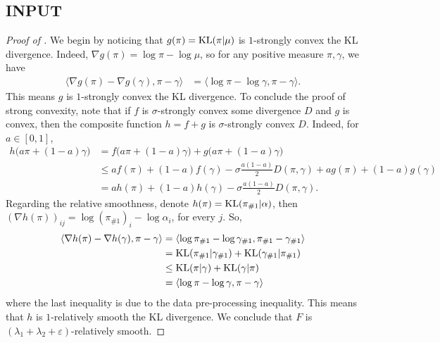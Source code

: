 \subsection{INPUT}
\begin{proof}[Proof of ]
We begin by noticing that $g(\pi) = \text{KL}(\pi | \mu)$ is $1$-strongly convex \wrt the KL divergence.
Indeed, $\nabla g(\pi) = \log \pi - \log \mu$, so for any positive measure $\pi, \gamma$, we have
\begin{align}
    \langle \nabla g(\pi) - \nabla g(\gamma), \pi - \gamma \rangle
    &= \langle
    \log \pi - \log \gamma, \pi - \gamma \rangle.
\end{align}
This means $g$ is $1$-strongly convex \wrt the KL divergence.
To conclude the proof of strong convexity, note that if $f$ is $\sigma$-strongly convex \wrt
some divergence $D$ and $g$ is convex, then the composite function $h = f + g$ is
$\sigma$-strongly convex \wrt $D$. Indeed, for $a \in [0,1]$,
\begin{align}
    h \big( a \pi + (1-a) \gamma \big)
    &= f \big( a \pi + (1-a) \gamma \big) + g \big( a \pi + (1-a) \gamma \big) \\
    &\leq a f(\pi) + (1 - a) f(\gamma) - \sigma \frac{a (1 - a)}{2} D(\pi, \gamma)
    + a g(\pi) + (1 - a) g(\gamma) \\
    &= a h(\pi) + (1 - a) h(\gamma) - \sigma \frac{a (1 - a)}{2} D(\pi, \gamma).
\end{align}
Regarding the relative smoothness, denote $h(\pi) = \text{KL}(\pi_{\#1} | \alpha)$,
then $(\nabla h(\pi))_{ij} = \log (\pi_{\#1})_i - \log \alpha_i$, for every $j$. So,
\begin{equation}
    \begin{split}
        \langle \nabla h(\pi) - \nabla h(\gamma), \pi - \gamma \rangle
    &= \langle
    \log \pi_{\# 1} - \log \gamma_{\# 1}, \pi_{\# 1} - \gamma_{\# 1} \rangle\\
    &= \text{KL}(\pi_{\# 1} | \gamma_{\# 1}) + \text{KL}(\gamma_{\# 1} | \pi_{\# 1}) \\
    &\leq \text{KL}(\pi | \gamma) + \text{KL}(\gamma | \pi) \\
    &= \langle \log \pi - \log \gamma, \pi - \gamma \rangle
    \end{split}
\end{equation}
where the last inequality is due to the data pre-processing inequality.
This means that $h$ is $1$-relatively smooth \wrt the KL divergence.
We conclude that $F$ is $(\lambda_1 + \lambda_2 + \varepsilon)$-relatively smooth.
\end{proof}

